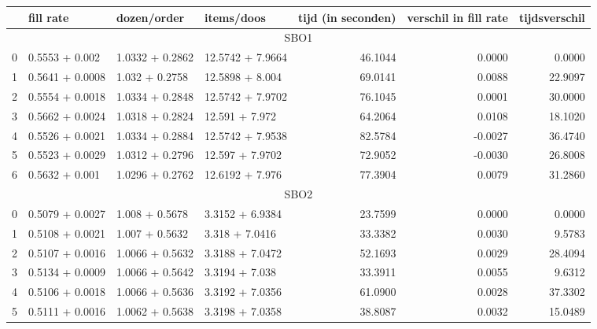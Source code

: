\begin{tabular}{llllrrr}
  \toprule
  {} &        fill rate &      dozen/order &       items/doos &  tijd (in seconden) &  verschil in fill rate &  tijdsverschil \\
  \midrule
  \multicolumn{7}{c}{SBO1} \\
  \midrule
  0 &   0.5553 + 0.002 &  1.0332 + 0.2862 &  12.5742 + 7.9664 &             46.1044 &                 0.0000 &         0.0000 \\
  1 &  0.5641 + 0.0008 &   1.032 + 0.2758 &   12.5898 + 8.004 &             69.0141 &                 0.0088 &        22.9097 \\
  2 &  0.5554 + 0.0018 &  1.0334 + 0.2848 &  12.5742 + 7.9702 &             76.1045 &                 0.0001 &        30.0000 \\
  3 &  0.5662 + 0.0024 &  1.0318 + 0.2824 &    12.591 + 7.972 &             64.2064 &                 0.0108 &        18.1020 \\
  4 &  0.5526 + 0.0021 &  1.0334 + 0.2884 &  12.5742 + 7.9538 &             82.5784 &                -0.0027 &        36.4740 \\
  5 &  0.5523 + 0.0029 &  1.0312 + 0.2796 &   12.597 + 7.9702 &             72.9052 &                -0.0030 &        26.8008 \\
  6 &   0.5632 + 0.001 &  1.0296 + 0.2762 &   12.6192 + 7.976 &             77.3904 &                 0.0079 &        31.2860 \\
  \midrule
  \multicolumn{7}{c}{SBO2} \\
  \midrule
  0 &  0.5079 + 0.0027 &   1.008 + 0.5678 &  3.3152 + 6.9384 &             23.7599 &                 0.0000 &         0.0000 \\
  1 &  0.5108 + 0.0021 &   1.007 + 0.5632 &   3.318 + 7.0416 &             33.3382 &                 0.0030 &         9.5783 \\
  2 &  0.5107 + 0.0016 &  1.0066 + 0.5632 &  3.3188 + 7.0472 &             52.1693 &                 0.0029 &        28.4094 \\
  3 &  0.5134 + 0.0009 &  1.0066 + 0.5642 &   3.3194 + 7.038 &             33.3911 &                 0.0055 &         9.6312 \\
  4 &  0.5106 + 0.0018 &  1.0066 + 0.5636 &  3.3192 + 7.0356 &             61.0900 &                 0.0028 &        37.3302 \\
  5 &  0.5111 + 0.0016 &  1.0062 + 0.5638 &  3.3198 + 7.0358 &             38.8087 &                 0.0032 &        15.0489 \\

\end{tabular}
